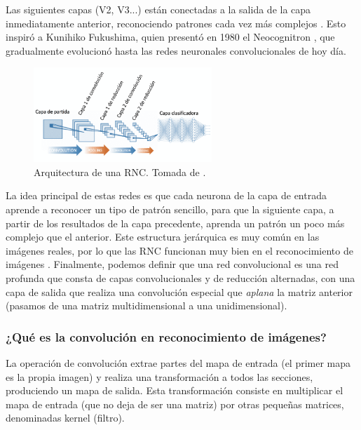 \documentclass[../main.tex]{subfiles}
\begin{document}
Las siguientes capas (V2, V3...) están conectadas a la salida de la capa inmediatamente anterior, reconociendo patrones cada vez más complejos \cite{Geron2019}. Esto inspiró a Kunihiko Fukushima, quien presentó en 1980 el Neocognitron \cite{Fukushima1980}, que gradualmente evolucionó hasta las redes neuronales convolucionales de hoy día. \newline

\begin{figure}[h]
    \centering
    \includegraphics[width=0.6\textwidth]{imagenes/red-neuronal-convolucional-arquitectura.png}
    \caption[Arquitectura de una RNC]{Arquitectura de una RNC. Tomada de \cite{Calvo2017}.}
    \label{fig:arquitectura_convolucional}
\end{figure}

La idea principal de estas redes es que cada neurona de la capa de entrada aprende a reconocer un tipo de patrón sencillo, para que la siguiente capa, a partir de los resultados de la capa precedente, aprenda un patrón un poco más complejo que el anterior. Este estructura jerárquica es muy común en las imágenes reales, por lo que las RNC funcionan muy bien en el reconocimiento de imágenes \cite{Geron2019}. Finalmente, podemos definir que una red convolucional es una red profunda que consta de capas convolucionales y de reducción alternadas, con una capa de salida que realiza una convolución especial que \textit{aplana} la matriz anterior (pasamos de una matriz multidimensional a una unidimensional). 

\subsubsection{¿Qué es la convolución en reconocimiento de imágenes?}

La operación de convolución extrae partes del mapa de entrada (el primer mapa es la propia imagen) y realiza una transformación a todos las secciones, produciendo un mapa de salida. Esta transformación consiste en multiplicar el mapa de entrada (que no deja de ser una matriz) por otras pequeñas matrices, denominadas kernel (filtro). \newline
\end{document}
